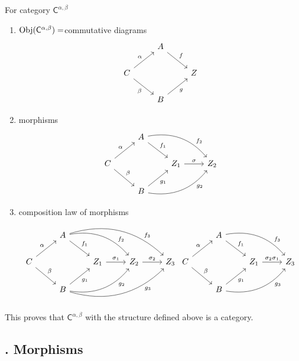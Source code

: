 \begin{solution}
For category $\mathsf{C}^{\alpha,\beta}$
\begin{enumerate}
\item $\mathrm{Obj}(\mathsf{C}^{\alpha,\beta})=$commutative diagrams
%
\[
\begin{tikzcd}
& A \arrow[dr, "f"]& \\
C \arrow[ur, "\alpha"] \arrow[dr, "\beta"'] & & Z\\
& B \arrow[ur, "g"'] &
\end{tikzcd}
\]
%
\item morphisms
%
\[
\begin{tikzcd}
& A \arrow[dr, "f_1"] \arrow[drr, bend left, "f_2" near end] & & \\
C \arrow[ur, "\alpha"] \arrow[dr, "\beta"] & & Z_1\arrow[r, "\sigma"] & Z_2\\
& B \arrow[ur, "g_1"'] \arrow[urr, bend right, "g_2"' near end] & &
\end{tikzcd}
\]
%
\item composition law of morphisms
%
\[
\begin{tikzcd}
& A \arrow[dr, "f_1"] \arrow[drr, bend left, "f_2" near end] \arrow[drrr, bend left, "f_3" near end] &  & & \\
C \arrow[ur, "\alpha"] \arrow[dr, "\beta"] & & Z_1\arrow[r, "\sigma_1"] & Z_2 \arrow[r, "\sigma_2"] & Z_3\\
& B \arrow[ur, "g_1"'] \arrow[urr, bend right, "g_2"' near end] \arrow[urrr, bend right, "g_3"' near end]& & &
\end{tikzcd}
\begin{tikzcd}
& A \arrow[dr, "f_1"] \arrow[drr, bend left, "f_3" near end] & & \\
C \arrow[ur, "\alpha"] \arrow[dr, "\beta"] & & Z_1\arrow[r, "\sigma_2\sigma_1"] & Z_3\\
& B \arrow[ur, "g_1"'] \arrow[urr, bend right, "g_3"' near end] & &
\end{tikzcd}
\]
%
\end{enumerate}
This proves that $\mathsf{C}^{\alpha,\beta}$ with the structure defined above is a category.
\end{solution}

\subsection{. Morphisms}

